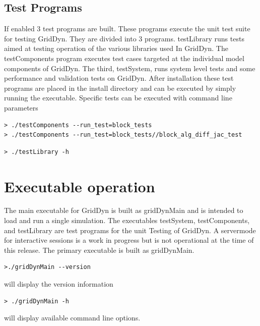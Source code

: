 \documentclass[12pt]{article} %
\begin{document}
\subsection{Test Programs}
If enabled 3 test programs are built.  These programs execute the unit test suite for testing GridDyn.  They are divided into 3 programs.  testLibrary runs tests aimed at testing operation of the various libraries used In GridDyn.  The testComponents program executes test cases targeted at the individual model components of GridDyn.  The third, testSystem, runs system level tests and some performance and validation tests on GridDyn.  After installation these test programs are placed in the install directory and can be executed by simply running the executable.  Specific tests can be executed with command line parameters
\begin{verbatim}
> ./testComponents --run_test=block_tests
> ./testComponents --run_test=block_tests//block_alg_diff_jac_test
\end{verbatim}

\begin{verbatim}
> ./testLibrary -h
\end{verbatim}
\section{Executable operation}
The main executable for GridDyn is built as gridDynMain  and is intended to load and run a single simulation.    The executables testSystem, testComponents, and testLibrary are test programs for the unit Testing of GridDyn.  A servermode for interactive sessions is a work in progress but is not operational at the time of this release.  The primary executable is built as gridDynMain.  
\begin{verbatim}
>./gridDynMain --version 
\end{verbatim}  
will display the version information
\begin{verbatim}
> ./gridDynMain -h
\end{verbatim}
will display available command line options.
\end{document}
